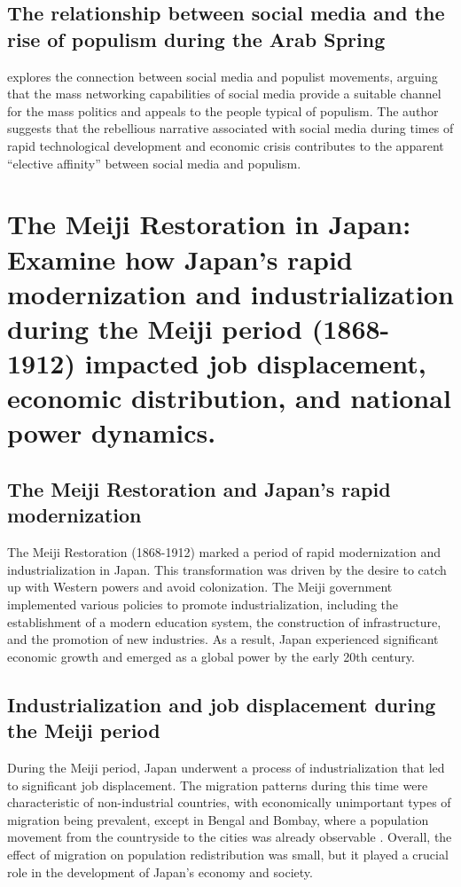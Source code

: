 \documentclass{article}
\begin{document}
\subsection{The relationship between social media and the rise of populism during the Arab Spring}

\cite{Gerbaudo2018SocialMA} explores the connection between social media and populist movements, arguing that the mass networking capabilities of social media provide a suitable channel for the mass politics and appeals to the people typical of populism. The author suggests that the rebellious narrative associated with social media during times of rapid technological development and economic crisis contributes to the apparent ``elective affinity'' between social media and populism.


\section{The Meiji Restoration in Japan: Examine how Japan's rapid modernization and industrialization during the Meiji period (1868-1912) impacted job displacement, economic distribution, and national power dynamics.}

\subsection{The Meiji Restoration and Japan's rapid modernization}

The Meiji Restoration (1868-1912) marked a period of rapid modernization and industrialization in Japan. This transformation was driven by the desire to catch up with Western powers and avoid colonization. The Meiji government implemented various policies to promote industrialization, including the establishment of a modern education system, the construction of infrastructure, and the promotion of new industries. As a result, Japan experienced significant economic growth and emerged as a global power by the early 20th century.

\subsection{Industrialization and job displacement during the Meiji period}

During the Meiji period, Japan underwent a process of industrialization that led to significant job displacement. The migration patterns during this time were characteristic of non-industrial countries, with economically unimportant types of migration being prevalent, except in Bengal and Bombay, where a population movement from the countryside to the cities was already observable \cite{None}. Overall, the effect of migration on population redistribution was small, but it played a crucial role in the development of Japan's economy and society.
\end{document}

